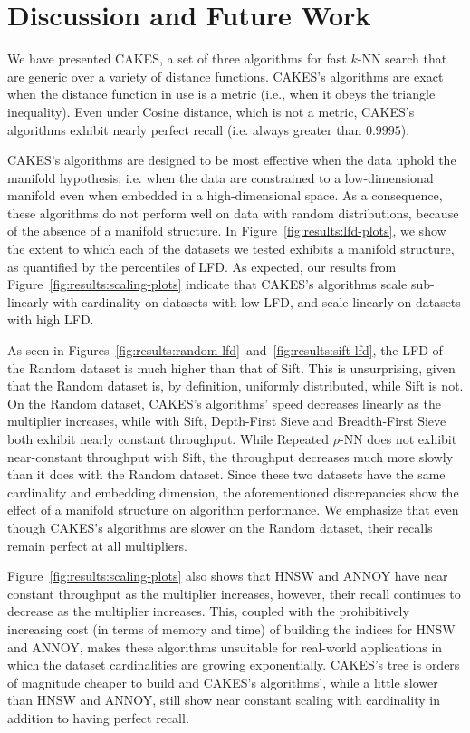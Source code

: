\section{Discussion and Future Work}
\label{sec:discussion-and-future-work}

We have presented CAKES, a set of three algorithms for fast $k$-NN search that are generic over a variety of distance functions.
CAKES's algorithms are exact when the distance function in use is a metric (i.e., when it obeys the triangle inequality).
Even under Cosine distance, which is not a metric, CAKES's algorithms exhibit nearly perfect recall (i.e. always greater than $0.9995$).

CAKES's algorithms are designed to be most effective when the data uphold the manifold hypothesis, i.e. when the data are constrained to a low-dimensional manifold even when embedded in a high-dimensional space.
As a consequence, these algorithms do not perform well on data with random distributions, because of the absence of a manifold structure.
In Figure~\ref{fig:results:lfd-plots}, we show the extent to which each of the datasets we tested exhibits a manifold structure, as quantified by the percentiles of LFD.
As expected, our results from Figure~\ref{fig:results:scaling-plots} indicate that CAKES's algorithms scale sub-linearly with cardinality on datasets with low LFD, and scale linearly on datasets with high LFD.

As seen in Figures~\ref{fig:results:random-lfd}~and~\ref{fig:results:sift-lfd}, the LFD of the Random dataset is much higher than that of Sift.
This is unsurprising, given that the Random dataset is, by definition, uniformly distributed, while Sift is not.
On the Random dataset, CAKES's algorithms' speed decreases linearly as the multiplier increases, while with Sift, Depth-First Sieve and Breadth-First Sieve both exhibit nearly constant throughput.
While Repeated $\rho$-NN does not exhibit near-constant throughput with Sift, the throughput decreases much more slowly than it does with the Random dataset.
Since these two datasets have the same cardinality and embedding dimension, the aforementioned discrepancies show the effect of a manifold structure on algorithm performance.
We emphasize that even though CAKES's algorithms are slower on the Random dataset, their recalls remain perfect at all multipliers.

Figure~\ref{fig:results:scaling-plots} also shows that HNSW and ANNOY have near constant throughput as the multiplier increases, however, their recall continues to decrease as the multiplier increases.
This, coupled with the prohibitively increasing cost (in terms of memory and time) of building the indices for HNSW and ANNOY, makes these algorithms unsuitable for real-world applications in which the dataset cardinalities are growing exponentially.
CAKES's tree is orders of magnitude cheaper to build and CAKES's algorithms', while a little slower than HNSW and ANNOY, still show near constant scaling with cardinality in addition to having perfect recall.

